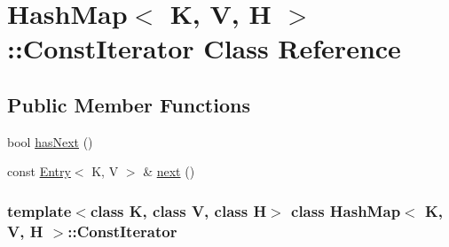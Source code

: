 \hypertarget{class_hash_map_1_1_const_iterator}{
\section{HashMap$<$ K, V, H $>$::ConstIterator Class Reference}
\label{class_hash_map_1_1_const_iterator}
}
\subsection*{Public Member Functions}
\begin{DoxyCompactItemize}
\item 
bool \hyperlink{class_hash_map_1_1_const_iterator_af50fbe8aa3e2d46aaac30ce035aa2d0b}{hasNext} ()
\item 
const \hyperlink{class_entry}{Entry}$<$ K, V $>$ \& \hyperlink{class_hash_map_1_1_const_iterator_a1438b2ea9a587565e89f4dc7559ff130}{next} ()
\end{DoxyCompactItemize}
\subsubsection*{template$<$class K, class V, class H$>$ class HashMap$<$ K, V, H $>$::ConstIterator}




